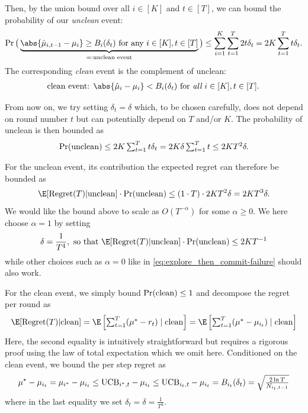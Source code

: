Then, by the union bound over all $i\in[K]$ and $t\in[T]$, we can bound the probability of our {\em unclean} event:
\begin{align*}
    \Pr\big(\underbrace{\abs{\hat{\mu}_{i, t-1}-\mu_i} \geq B_i(\delta_t) \text{ for any } i\in[K], t\in[T]}_{=:\text{unclean event}} \big) \leq \sum_{i=1}^{K}\sum_{t=1}^{T}2t\delta_t = 2K \sum_{t=1}^{T}t\delta_t
    .
\end{align*}
The corresponding {\em clean} event is the complement of unclean:
\begin{align*}
\text{
clean event: $\abs{\hat{\mu}_i-\mu_i} < B_i(\delta_t)$ for {\em all} $i\in[K], t\in[T]$. 
}    
\end{align*}

From now on, we try setting $\delta_t=\delta$ which, to be chosen carefully, does not depend on round number $t$ but can potentially depend on $T$ and/or $K$.
The probability of unclean is then bounded as
\begin{align*}
    \Pr({\rm unclean}) \leq 2K \textstyle\sum_{t=1}^{T}t\delta_t = 2K\delta \sum_{t=1}^{T}t \leq 2KT^2\delta
    .
\end{align*}

For the unclean event, its contribution the expected regret can therefore be bounded as
\begin{align*}
    \E[\Regret(T) | {\rm unclean}] \cdot \Pr({\rm unclean})
    \leq (1\cdot T) \cdot 2KT^2\delta =  2KT^3\delta
    .
\end{align*}
We would like the bound above to scale as $O(T^{-\alpha})$ for some $\alpha\geq0$.
We here choose $\alpha=1$ by setting 
\begin{align}
\label{eq:UCB-unclean}
    \delta=\frac{1}{T^4},
    \text{ so that }
    \E[\Regret(T) | {\rm unclean}] \cdot \Pr({\rm unclean}) \leq 2KT^{-1}
\end{align}
while other choices such as $\alpha=0$ like in  \eqref{eq:explore_then_commit-failure} should also work. 

For the clean event, we simply bound $\Pr({\rm clean})\leq1$ and decompose the regret per round as 
\begin{align*}
\E[\Regret(T) | {\rm clean}] = \E\left[\textstyle\sum_{t=1}^{T} (\mu^*-r_t) \mid {\rm clean}\right] = 
\E\left[\textstyle\sum_{t=1}^{T} (\mu^*-\mu_{i_t}) \mid {\rm clean}\right]
\end{align*}
Here, the second equality is intuitively straightforward but requires a rigorous proof using the law of total expectation which we omit here.
Conditioned on the clean event, we bound the per step regret as 
\begin{align}
\label{eq:UCB-regret_decomposition}
   \mu^*-\mu_{i_t} = \mu_{i^*}-\mu_{i_t} \leq  {\rm UCB}_{i^*,t} - \mu_{i_t}
   \leq {\rm UCB}_{i_t,t} - \mu_{i_t}
   = B_{i_t}(\delta_t)
   = \sqrt{\tfrac{2\ln T}{N_{i_t,t-1}}}
\end{align}
where in the last equality we set $\delta_t=\delta=\frac{1}{T^4}$.

